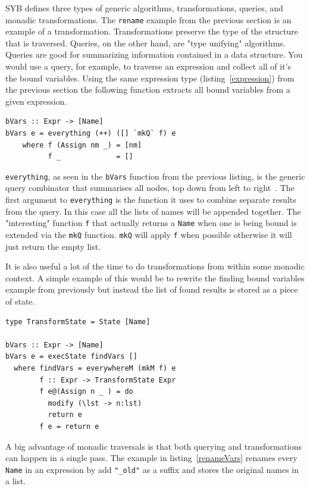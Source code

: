 SYB defines three types of generic algorithms, transformations, queries, and monadic transformations. The \texttt{rename} example from the previous section is an example of a transformation. Transformations preserve the type of the structure that is traversed. Queries, on the other hand, are "type unifying" algorithms. Queries are good for summarizing information contained in a data structure. You would use a query, for example, to traverse an expression and collect all of it's the bound variables. Using the same expression type (listing~\ref{expression}) from the previous section the following function extracts all bound variables from a given expression.

\begin{lstlisting}[caption={A generic function that collects all bound variables from an expression.}]
bVars :: Expr -> [Name]
bVars e = everything (++) ([] `mkQ` f) e
	where f (Assign nm _) = [nm]
          f _             = []
\end{lstlisting}

\texttt{everything}, as seen in the \texttt{bVars} function from the previous listing, is the generic query combinator that summarises all nodes, top down from left to right~\citep{sybDocs}. The first argument to \texttt{everything} is the function it uses to combine separate results from the query. In this case all the lists of names will be appended together. The "interesting" function \texttt{f} that actually returns a \texttt{Name} when one is being bound is extended via the \texttt{mkQ} function. \texttt{mkQ} will apply \texttt{f} when possible otherwise it will just return the empty list.

It is also useful a lot of the time to do transformations from within some monadic context. A simple example of this would be to rewrite the finding bound variables example from previously but instead the list of found results is stored as a piece of state.

\begin{lstlisting}[caption={Finding bound variables using the state monad}]
type TransformState = State [Name]

bVars :: Expr -> [Name]
bVars e = execState findVars []
  where findVars = everywhereM (mkM f) e
        f :: Expr -> TransformState Expr
        f e@(Assign n _ ) = do
          modify (\lst -> n:lst)
          return e
        f e = return e
\end{lstlisting}

A big advantage of monadic traversals is that both querying and transformations can happen in a single pass. The example in listing~\ref{renameVars} renames every \texttt{Name} in an expression by add \texttt{"\_old"} as a suffix and stores the original names in a list. 

